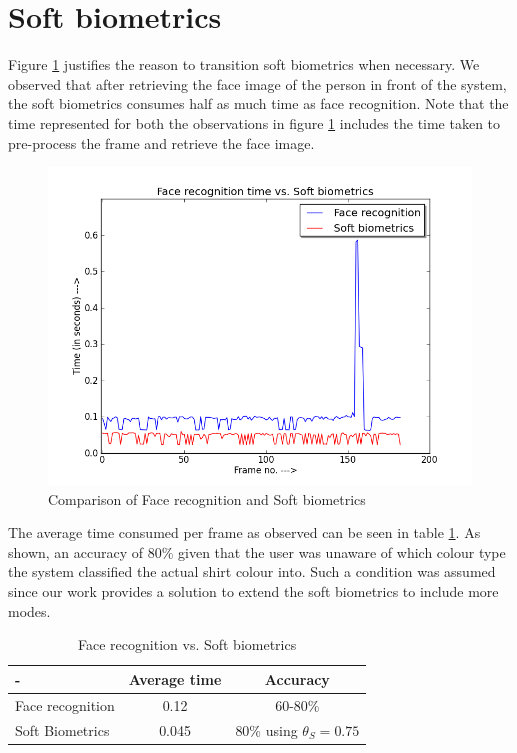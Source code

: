\documentclass[12pt]{report}			%
\begin{document}
\section{Soft biometrics}
Figure \ref{fig:fsoft} justifies the reason to transition soft biometrics when necessary.
We observed that after retrieving the face image of the person in front of the system, the soft biometrics consumes half as much time as face recognition.
Note that the time represented for both the observations in figure \ref{fig:fsoft} includes the time taken to pre-process the frame and retrieve the face image.
\begin{figure}[h!]
	\centering
	\includegraphics[scale=0.40]{img/face_vs_soft.png}
	\caption{Comparison of Face recognition and Soft biometrics}
	\label{fig:fsoft}
\end{figure}
The average time consumed per frame as observed can be seen in table \ref{tab:frsb}.
As shown, an accuracy of 80\% given that the user was unaware of which colour type the system classified the actual shirt colour into.
Such a condition was assumed since our work provides a solution to extend the soft biometrics to include more modes.
\begin{table}[htp]
	\centering
	\caption{Face recognition vs. Soft biometrics}
	\begin{tabular}{||l|c|c||} \hline \hline
	-                  &  Average time  &  Accuracy \\ \hline
	Face recognition   &  0.12          &  60-80\% \\ \hline
	Soft Biometrics    &  0.045         &  80\% using $\theta_{S}=0.75$ \\ \hline \hline
	\end{tabular}
	\label{tab:frsb}
\end{table}
\end{document}
